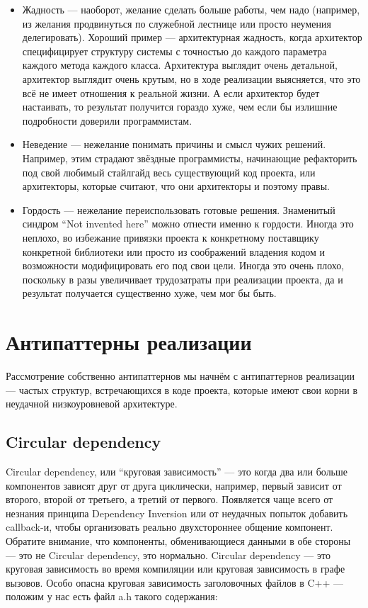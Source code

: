 \documentclass{../../text-style}
\begin{document}
\begin{itemize}
    \item Жадность --- наоборот, желание сделать больше работы, чем надо (например, из желания продвинуться по служебной лестнице или просто неумения делегировать). Хороший пример --- архитектурная жадность, когда архитектор специфицирует структуру системы с точностью до каждого параметра каждого метода каждого класса. Архитектура выглядит очень детальной, архитектор выглядит очень крутым, но в ходе реализации выясняется, что это всё не имеет отношения к реальной жизни. А если архитектор будет настаивать, то результат получится гораздо хуже, чем если бы излишние подробности доверили программистам.
    \item Неведение --- нежелание понимать причины и смысл чужих решений. Например, этим страдают звёздные программисты, начинающие рефакторить под свой любимый стайлгайд весь существующий код проекта, или архитекторы, которые считают, что они архитекторы и поэтому правы.
    \item Гордость --- нежелание переиспользовать готовые решения. Знаменитый синдром ``Not invented here'' можно отнести именно к гордости. Иногда это неплохо, во избежание привязки проекта к конкретному поставщику конкретной библиотеки или просто из соображений владения кодом и возможности модифицировать его под свои цели. Иногда это очень плохо, поскольку в разы увеличивает трудозатраты при реализации проекта, да и результат получается существенно хуже, чем мог бы быть.
\end{itemize}

\section{Антипаттерны реализации}

Рассмотрение собственно антипаттернов мы начнём с антипаттернов реализации --- частых структур, встречающихся в коде проекта, которые имеют свои корни в неудачной низкоуровневой архитектуре.

\subsection{Circular dependency}

Circular dependency, или ``круговая зависимость'' --- это когда два или больше компонентов зависят друг от друга циклически, например, первый зависит от второго, второй от третьего, а третий от первого. Появляется чаще всего от незнания принципа Dependency Inversion или от неудачных попыток добавить callback-и, чтобы организовать реально двухстороннее общение компонент. Обратите внимание, что компоненты, обменивающиеся данными в обе стороны --- это не Circular dependency, это нормально. Circular dependency --- это круговая зависимость во время компиляции или круговая зависимость в графе вызовов. Особо опасна круговая зависимость заголовочных файлов в C++ --- положим у нас есть файл a.h такого содержания:
\end{document}
